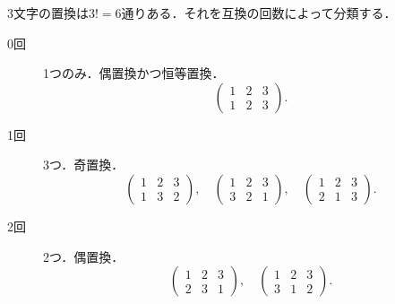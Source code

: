 \documentclass[a4paper,10pt,fleqn]{ltjsarticle}
\begin{document}
\begin{tleftbar}
  3文字の置換は$3!=6$通りある．それを互換の回数によって分類する．
  \begin{description}
    \item[0回] 1つのみ．偶置換かつ恒等置換．
          \[
            \begin{pmatrix} 1 & 2 & 3 \\ 1 & 2 & 3 \end{pmatrix}.
          \]
    \item [1回] 3つ．奇置換．
          \[
            \begin{pmatrix} 1 & 2 & 3\\ 1 & 3 & 2 \end{pmatrix},\quad
            \begin{pmatrix} 1 & 2 & 3\\ 3 & 2 & 1 \end{pmatrix},\quad
            \begin{pmatrix} 1 & 2 & 3\\ 2 & 1 & 3 \end{pmatrix}.
          \]
    \item [2回] 2つ．偶置換．
          \[
            \begin{pmatrix} 1 & 2 & 3\\ 2 & 3 & 1 \end{pmatrix},\quad
            \begin{pmatrix} 1 & 2 & 3\\ 3 & 1 & 2 \end{pmatrix}.
          \]
  \end{description}
\end{tleftbar}

\end{document}
